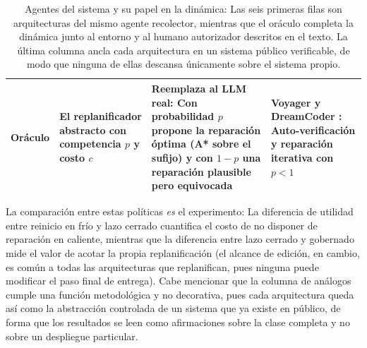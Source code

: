 \begin{table}[ht]
\begin{tabular}{@{}L{2.1cm} L{3.7cm} L{4.3cm} L{3.9cm}@{}}
\addlinespace
Oráculo & El replanificador abstracto con competencia $p$ y costo $c$ &
Reemplaza al LLM real: Con probabilidad $p$ propone la reparación óptima (A* sobre el
sufijo) y con $1-p$ una reparación plausible pero equivocada & Voyager \parencite{wang2023voyager} y DreamCoder \parencite{ellis2021dreamcoder}: Auto-verificación y reparación iterativa con $p<1$ \\
\bottomrule
\end{tabular}
\caption{Agentes del sistema y su papel en la dinámica: Las seis primeras filas son
arquitecturas del mismo agente recolector, mientras que el oráculo completa la dinámica
junto al entorno y al humano autorizador descritos en el texto. La última columna ancla cada
arquitectura en un sistema público verificable, de modo que ninguna de ellas descansa
únicamente sobre el sistema propio.}
\end{table}

La comparación entre estas políticas \emph{es} el experimento: La diferencia de
utilidad entre reinicio en frío y lazo cerrado cuantifica el costo de no disponer
de reparación en caliente, mientras que la diferencia entre lazo cerrado y gobernado
mide el valor de acotar la propia replanificación (el alcance de edición, en cambio, es
común a todas las arquitecturas que replanifican, pues ninguna puede modificar el paso final
de entrega). Cabe mencionar que la columna de análogos
cumple una función metodológica y no decorativa, pues cada arquitectura queda así como la
abstracción controlada de un sistema que ya existe en público, de forma que los resultados se
leen como afirmaciones sobre la clase completa y no sobre un despliegue particular.

